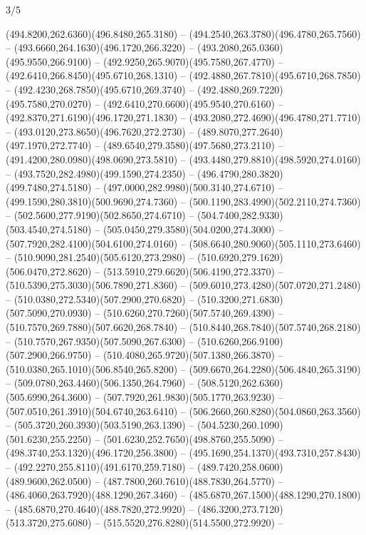 \begin{flagdescription}{3/5}
\begin{scope}[shift={(0.5\flaglength,0.5\flagwidth)},scale=\flagwidth/1075]
\begin{scope}[y=0.80pt, x=0.80pt, yscale=-2.37, xscale=2.37,xshift=-402,yshift=-230.4]
  (494.8200,262.6360)(496.8480,265.3180) --
  (494.2540,263.3780)(496.4780,265.7560) --
  (493.6660,264.1630)(496.1720,266.3220) --
  (493.2080,265.0360)(495.9550,266.9100) --
  (492.9250,265.9070)(495.7580,267.4770) --
  (492.6410,266.8450)(495.6710,268.1310) --
  (492.4880,267.7810)(495.6710,268.7850) --
  (492.4230,268.7850)(495.6710,269.3740) --
  (492.4880,269.7220)(495.7580,270.0270) --
  (492.6410,270.6600)(495.9540,270.6160) --
  (492.8370,271.6190)(496.1720,271.1830) --
  (493.2080,272.4690)(496.4780,271.7710) --
  (493.0120,273.8650)(496.7620,272.2730) --
  (489.8070,277.2640)(497.1970,272.7740) --
  (489.6540,279.3580)(497.5680,273.2110) --
  (491.4200,280.0980)(498.0690,273.5810) --
  (493.4480,279.8810)(498.5920,274.0160) --
  (493.7520,282.4980)(499.1590,274.2350) --
  (496.4790,280.3820)(499.7480,274.5180) --
  (497.0000,282.9980)(500.3140,274.6710) --
  (499.1590,280.3810)(500.9690,274.7360) --
  (500.1190,283.4990)(502.2110,274.7360) --
  (502.5600,277.9190)(502.8650,274.6710) --
  (504.7400,282.9330)(503.4540,274.5180) --
  (505.0450,279.3580)(504.0200,274.3000) --
  (507.7920,282.4100)(504.6100,274.0160) --
  (508.6640,280.9060)(505.1110,273.6460) --
  (510.9090,281.2540)(505.6120,273.2980) --
  (510.6920,279.1620)(506.0470,272.8620) --
  (513.5910,279.6620)(506.4190,272.3370) --
  (510.5390,275.3030)(506.7890,271.8360) --
  (509.6010,273.4280)(507.0720,271.2480) --
  (510.0380,272.5340)(507.2900,270.6820) --
  (510.3200,271.6830)(507.5090,270.0930) --
  (510.6260,270.7260)(507.5740,269.4390) --
  (510.7570,269.7880)(507.6620,268.7840) --
  (510.8440,268.7840)(507.5740,268.2180) --
  (510.7570,267.9350)(507.5090,267.6300) --
  (510.6260,266.9100)(507.2900,266.9750) --
  (510.4080,265.9720)(507.1380,266.3870) --
  (510.0380,265.1010)(506.8540,265.8200) --
  (509.6670,264.2280)(506.4840,265.3190) --
  (509.0780,263.4460)(506.1350,264.7960) --
  (508.5120,262.6360)(505.6990,264.3600) --
  (507.7920,261.9830)(505.1770,263.9230) --
  (507.0510,261.3910)(504.6740,263.6410) --
  (506.2660,260.8280)(504.0860,263.3560) --
  (505.3720,260.3930)(503.5190,263.1390) --
  (504.5230,260.1090)(501.6230,255.2250) --
  (501.6230,252.7650)(498.8760,255.5090) --
  (498.3740,253.1320)(496.1720,256.3800) --
  (495.1690,254.1370)(493.7310,257.8430) --
  (492.2270,255.8110)(491.6170,259.7180) --
  (489.7420,258.0600)(489.9600,262.0500) --
  (487.7800,260.7610)(488.7830,264.5770) --
  (486.4060,263.7920)(488.1290,267.3460) --
  (485.6870,267.1500)(488.1290,270.1800) --
  (485.6870,270.4640)(488.7820,272.9920) --
  (486.3200,273.7120)(513.3720,275.6080) --
  (515.5520,276.8280)(514.5500,272.9920) --

\end{scope}
\end{scope}
\end{flagdescription}
